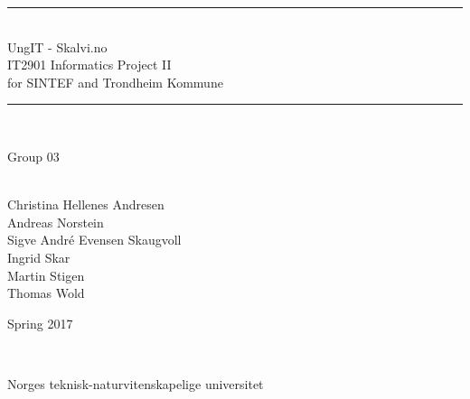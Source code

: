 \thispagestyle{empty}
\begin{center}


\noindent\rule{\textwidth}{1.3pt}
\\[1pc]
\Huge{UngIT - Skalvi.no}
\\[1pc]
\large{IT2901 Informatics Project II  \\for SINTEF and Trondheim Kommune}
\\[1pc]
\noindent\rule{\textwidth}{1.3pt}
\\[2pc]


\begin{bf}\Large{Group 03}\end{bf}
\\[1pc]

Christina Hellenes Andresen\\
Andreas Norstein\\
Sigve André Evensen Skaugvoll\\
Ingrid Skar\\
Martin Stigen\\
Thomas Wold\\
[4pc]


\begin{bf}
Spring 2017
\end{bf}
\\[3pc]


\begin{small}Norges teknisk-naturvitenskapelige universitet\end{small}

\end{center}

\pagebreak